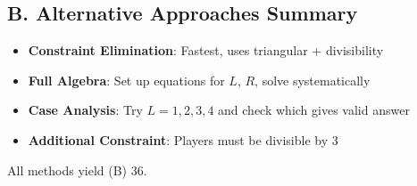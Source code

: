 \documentclass[12pt]{article}
\begin{document}
\begin{solutionbox}
\subsection*{B. Alternative Approaches Summary}
\begin{itemize}[leftmargin=*]
    \item \textbf{Constraint Elimination}: Fastest, uses triangular + divisibility
    \item \textbf{Full Algebra}: Set up equations for $L$, $R$, solve systematically
    \item \textbf{Case Analysis}: Try $L = 1, 2, 3, 4$ and check which gives valid answer
    \item \textbf{Additional Constraint}: Players must be divisible by 3
\end{itemize}

All methods yield (B) 36.
\end{solutionbox}
\end{document}
